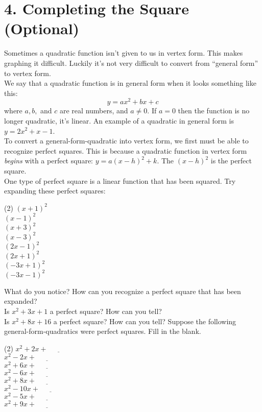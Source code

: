 \documentclass[12pt,fleqn]{book}
\begin{document}
\chapter{4. Completing the Square (Optional)}
Sometimes a quadratic function isn't given to us in vertex form.  This makes graphing it difficult.  Luckily it's not very difficult to convert from ``general form'' to vertex form.
\\[1em]
We say that a quadratic function is in general form when it looks something like this:
\[
	y=ax^2+bx+c
\]
where $a,b,$ and $c$ are real numbers, and $a\ne 0$.  If $a=0$ then the function is no longer quadratic, it's linear.  An example of a quadratic in general form is $y=2x^2+x-1$.
\\[1em]
To convert a general-form-quadratic into vertex form, we first must be able to recognize perfect squares.  This is because a quadratic function in vertex form \emph{begins} with a perfect square: $y=a(x-h)^2+k$.  The $(x-h)^2$ is the perfect square.
\\[1em]
One type of perfect square is a linear function that has been squared.  Try expanding these perfect squares:
\begin{tasks}(2)
	\task $(x+1)^2$\\[3em]
	\task $(x-1)^2$\\[3em]
	\task $(x+3)^2$\\[3em]
	\task $(x-3)^2$\\[3em]
	\task $(2x-1)^2$\\[3em]
	\task $(2x+1)^2$\\[3em]
	\task $(-3x+1)^2$\\[3em]
	\task $(-3x-1)^2$\\[3em]
\end{tasks}
What do you notice?  How can you recognize a perfect square that has been expanded?
\\[2em]
Is $x^2+3x+1$ a perfect square?  How can you tell?
\\[2em]
Is $x^2+8x+16$ a perfect square?  How can you tell?
\clearpage
Suppose the following general-form-quadratics were perfect squares. Fill in the blank.\\[1em]
\begin{tasks}(2)
	\task $x^2+2x+\underline{\hspace{3em}}$\\[2em]
	\task $x^2-2x+\underline{\hspace{3em}}$\\[2em]
	\task $x^2+6x+\underline{\hspace{3em}}$\\[2em]
	\task $x^2-6x+\underline{\hspace{3em}}$\\[2em]
	\task $x^2+8x+\underline{\hspace{3em}}$\\[2em]
	\task $x^2-10x+\underline{\hspace{3em}}$\\[2em]
	\task $x^2-5x+\underline{\hspace{3em}}$\\[2em]
	\task $x^2+9x+\underline{\hspace{3em}}$\\[2em]
\end{tasks}
\end{document}
